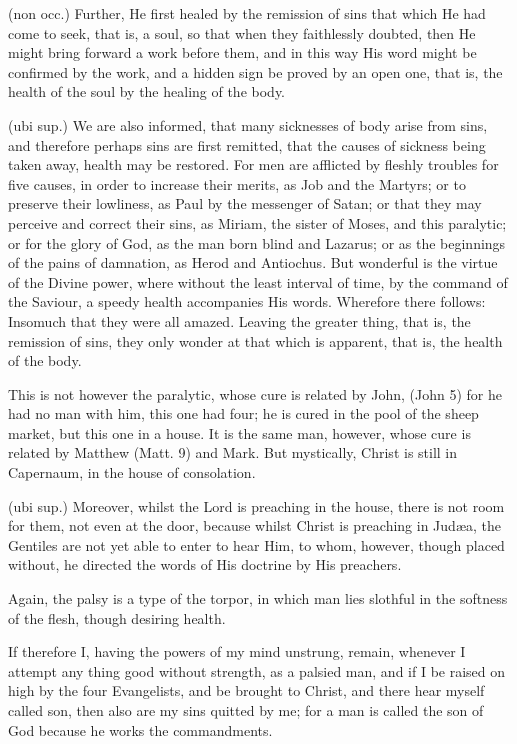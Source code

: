  (non occ.) Further, He first healed by the remission of sins that which He had come to seek, that is, a soul, so that when they faithlessly doubted, then He might bring forward a work before them, and in this way His word might be confirmed by the work, and a hidden sign be proved by an open one, that is, the health of the soul by the healing of the body.

 (ubi sup.) We are also informed, that many sicknesses of body arise from sins, and therefore perhaps sins are first remitted, that the causes of sickness being taken away, health may be restored. For men are afflicted by fleshly troubles for five causes, in order to increase their merits, as Job and the Martyrs; or to preserve their lowliness, as Paul by the messenger of Satan; or that they may perceive and correct their sins, as Miriam, the sister of Moses, and this paralytic; or for the glory of God, as the man born blind and Lazarus; or as the beginnings of the pains of damnation, as Herod and Antiochus. But wonderful is the virtue of the Divine power, where without the least interval of time, by the command of the Saviour, a speedy health accompanies His words. Wherefore there follows: Insomuch that they were all amazed. Leaving the greater thing, that is, the remission of sins, they only wonder at that which is apparent, that is, the health of the body.

 This is not however the paralytic, whose cure is related by John, (John 5) for he had no man with him, this one had four; he is cured in the pool of the sheep market, but this one in a house. It is the same man, however, whose cure is related by Matthew (Matt. 9) and Mark. But mystically, Christ is still in Capernaum, in the house of consolation.

 (ubi sup.) Moreover, whilst the Lord is preaching in the house, there is not room for them, not even at the door, because whilst Christ is preaching in Judæa, the Gentiles are not yet able to enter to hear Him, to whom, however, though placed without, he directed the words of His doctrine by His preachers.

 Again, the palsy is a type of the torpor, in which man lies slothful in the softness of the flesh, though desiring health.

 If therefore I, having the powers of my mind unstrung, remain, whenever I attempt any thing good without strength, as a palsied man, and if I be raised on high by the four Evangelists, and be brought to Christ, and there hear myself called son, then also are my sins quitted by me; for a man is called the son of God because he works the commandments.

